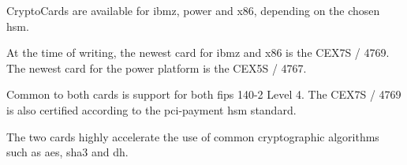 CryptoCards are available for \gls{ibmz}, \gls{power} and \gls{x86}, depending on the chosen \gls{hsm}.

At the time of writing, the newest card for \gls{ibmz} and \gls{x86} is the CEX7S / 4769\cite{ibm:4769}. The newest card for the \gls{power} platform is the CEX5S / 4767\cite{ibm:4767}.

Common to both cards is support for both \gls{fips} 140-2 Level 4. The CEX7S / 4769 is also certified according to the \gls{pci-payment} \gls{hsm} standard\cite{ibm:4769,ibm:4767}.

The two cards highly accelerate the use of common cryptographic algorithms such as \gls{aes}, \gls{sha3} and \gls{dh}\cite{ibm:4767,ibm:4769}.